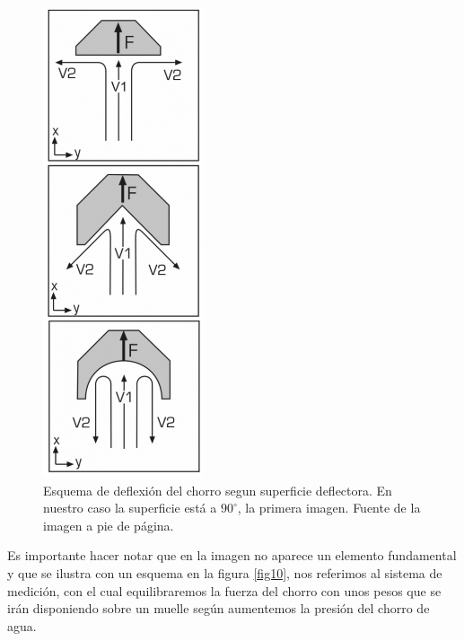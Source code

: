 \documentclass[12pt,a4paper]{article}
\newcommand{\grad}{^{\circ}}
\begin{document}
\begin{figure}
\vspace{-0.55cm}
 	 \begin{center}
  \includegraphics[width=0.42\textwidth]{fotos/deflectores}
  	 \end{center}
  	 \vspace{-0.55cm}
  	\caption[]{Esquema de deflexión del chorro segun superficie deflectora. En nuestro caso la superficie está a $90\grad$, la primera imagen. Fuente de la imagen a pie de página.\footnotemark }
  	\label{fig11}
\end{figure}
Es importante hacer notar que en la imagen no aparece un elemento fundamental y que se ilustra con un esquema en la figura \ref{fig10}, nos referimos al sistema de medición, con el cual equilibraremos la fuerza del chorro con unos pesos que se irán disponiendo sobre un muelle según aumentemos la presión del chorro de agua.

\end{document}
